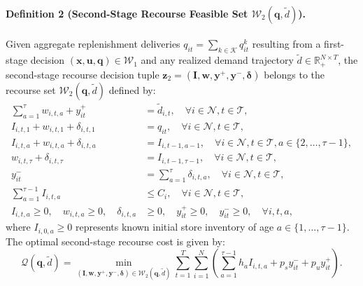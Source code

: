 \documentclass[11pt,a4paper]{article}
\theoremstyle{definition}
\theoremstyle{remark}
\begin{document}
\paragraph{Definition 2 (Second-Stage Recourse Feasible Set $\mathcal{W}_2(\mathbf{q}, \tilde{d})$).}
Given aggregate replenishment deliveries $q_{it} = \sum_{k \in \mathcal{K}} q_{it}^k$ resulting from a first-stage decision $(\mathbf{x}, \mathbf{u}, \mathbf{q}) \in \mathcal{W}_1$ and any realized demand trajectory $\tilde{d} \in \mathbb{R}_+^{N \times T}$, the second-stage recourse decision tuple $\mathbf{z}_2 = (\mathbf{I}, \mathbf{w}, \mathbf{y}^+, \mathbf{y}^-, \boldsymbol{\delta})$ belongs to the recourse set $\mathcal{W}_2(\mathbf{q}, \tilde{d})$ defined by:
\begin{align}
    \sum_{a=1}^\tau w_{i,t,a} + y_{it}^+ &= \tilde{d}_{i,t}, \quad \forall i \in \mathcal{N}, t \in \mathcal{T}, \label{eq:w2_demand} \\
    I_{i,t,1} + w_{i,t,1} + \delta_{i,t,1} &= q_{it}, \quad \forall i \in \mathcal{N}, t \in \mathcal{T}, \label{eq:w2_fresh} \\
    I_{i,t,a} + w_{i,t,a} + \delta_{i,t,a} &= I_{i,t-1,a-1}, \quad \forall i \in \mathcal{N}, t \in \mathcal{T}, a \in \{2, \dots, \tau-1\}, \label{eq:w2_inter} \\
    w_{i,t,\tau} + \delta_{i,t,\tau} &= I_{i,t-1,\tau-1}, \quad \forall i \in \mathcal{N}, t \in \mathcal{T}, \label{eq:w2_spoilage} \\
    y_{it}^- &= \sum_{a=1}^\tau \delta_{i,t,a}, \quad \forall i \in \mathcal{N}, t \in \mathcal{T}, \label{eq:w2_total_disposal} \\
    \sum_{a=1}^{\tau-1} I_{i,t,a} &\le C_i, \quad \forall i \in \mathcal{N}, t \in \mathcal{T}, \label{eq:w2_store_cap} \\
    I_{i,t,a} \ge 0, \quad w_{i,t,a} \ge 0, \quad \delta_{i,t,a} &\ge 0, \quad y_{it}^+ \ge 0, \quad y_{it}^- \ge 0, \quad \forall i, t, a, \label{eq:w2_bounds}
\end{align}
where $I_{i,0,a} \ge 0$ represents known initial store inventory of age $a \in \{1, \dots, \tau-1\}$. The optimal second-stage recourse cost is given by:
\begin{equation}
    \mathcal{Q}(\mathbf{q}, \tilde{d}) = \min_{(\mathbf{I}, \mathbf{w}, \mathbf{y}^+, \mathbf{y}^-, \boldsymbol{\delta}) \in \mathcal{W}_2(\mathbf{q}, \tilde{d})} \sum_{t=1}^T \sum_{i=1}^N \left( \sum_{a=1}^{\tau-1} h_a I_{i,t,a} + p_s y_{it}^- + p_u y_{it}^+ \right). \label{eq:recourse_cost_function}
\end{equation}
\end{document}

